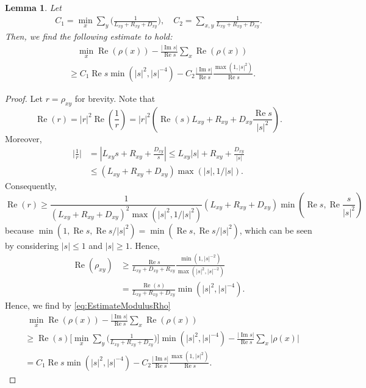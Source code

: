 \documentclass[a4paper,11pt]{amsart}
\newtheorem{lemma}[theorem]{Lemma}
\theoremstyle{definition}
\renewcommand{\Re}{\operatorname{Re}}%
\renewcommand{\Im}{\operatorname{Im}}%
\begin{document}
\begin{lemma}
\label{lem:LowerBoundAdmittance}
Let
\begin{align*}
C_1 = \min_x \sum_y \big( \frac{1}{L_{xy} + R_{xy} + D_{xy}} \big), \quad C_2 = \sum_{x,y} \frac{1}{L_{xy} + R_{xy} + D_{xy}} .
\end{align*}
Then, we find the following estimate to hold:
\begin{equation}
\label{eq:LowerBoundRealPart}
\begin{split}
&\quad \min_x \Re (\rho(x)) - \frac{| \Im s|}{\Re s} \sum_x \Re (\rho(x)) \\
 &\geq C_1 \Re s \min(|s|^2,|s|^{-4}) - C_2 \frac{|\Im s|}{\Re s} \frac{\max(1,|s|^2)}{\Re s}.
\end{split}
\end{equation}
\end{lemma}
\begin{proof}
Let $r = \rho_{xy}$ for brevity. Note that
\begin{equation*}
\Re (r) = |r|^2 \Re \left( \frac{1}{r} \right) = |r|^2 \left( \Re (s) L_{xy} + R_{xy} + D_{xy} \frac{\Re s}{|s|^2} \right).
\end{equation*}
Moreover,
\begin{align*}
\big| \frac{1}{r} \big| &= |L_{xy} s + R_{xy} + \frac{D_{xy}}{s} | \leq L_{xy} |s| + R_{xy} + \frac{D_{xy}}{|s|} \\
&\leq (L_{xy} + R_{xy} + D_{xy}) \max( |s|, 1/|s|).
\end{align*}
Consequently,
\begin{equation*}
\Re (r) \geq \frac{1}{(L_{xy} + R_{xy} + D_{xy})^2 \max(|s|^2,1/|s|^2)} (L_{xy} + R_{xy} + D_{xy}) \min(\Re s, \Re \frac{s}{|s|^2})
\end{equation*}
because $\min(1, \Re s, \Re s/|s|^2) = \min( \Re s, \Re s/|s|^2)$, which can be seen by considering $|s| \leq 1$ and $|s| \geq 1$.
Hence,
\begin{align*}
\Re (\rho_{xy}) &\geq \frac{\Re s}{L_{xy} + D_{xy} + R_{xy}} \frac{\min(1,|s|^{-2})}{\max(|s|^2,|s|^{-2})} \\
&= \frac{\Re (s)}{L_{xy} + R_{xy} + D_{xy}} \min(|s|^2, |s|^{-4}).
\end{align*}
Hence, we find by \eqref{eq:EstimateModulusRho}
\begin{align*}
&\; \min_x \Re (\rho(x)) - \frac{| \Im s|}{\Re s} \sum_x \Re (\rho(x)) \\
&\geq \Re (s) \big[ \min_x \sum_y \big( \frac{1}{L_{xy} + R_{xy} + D_{xy}} \big) \big] \min(|s|^2,|s|^{-4}) - \frac{| \Im s|}{\Re s} \sum_x |\rho(x)| \\
&= C_1 \Re s \min(|s|^2,|s|^{-4}) - C_2 \frac{|\Im s|}{\Re s} \frac{\max(1,|s|^2)}{\Re s}.
\end{align*}
\end{proof}
\end{document}
